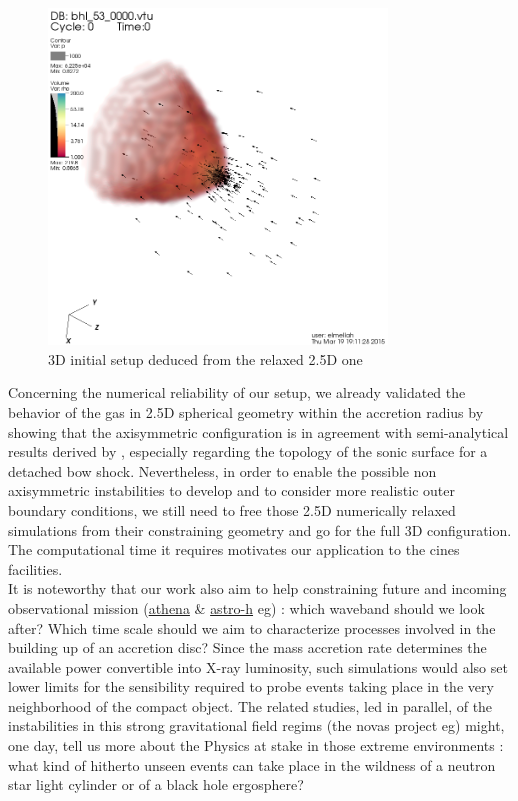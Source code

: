 \documentclass[
    a4paper, 
    12pt, onecolumn,
]{article}
\begin{document}
 \begin{figure}[h]
 \centering
 \includegraphics[width=9cm]{3D_initial_setup}  
 \caption{3D initial setup deduced from the relaxed 2.5D one}
 \label{fig:relax}
 \end{figure}
 
\indent Concerning the numerical reliability of our setup, we already validated the behavior of the gas in 2.5D spherical geometry within the accretion radius by showing that the axisymmetric configuration is in agreement with semi-analytical results derived by \citep{Foglizzo1996}, especially regarding the topology of the sonic surface for a detached bow shock. Nevertheless, in order to enable the possible non axisymmetric instabilities to develop and to consider more realistic outer boundary conditions, we still need to free those 2.5D numerically relaxed simulations from their constraining geometry and go for the full 3D configuration. The computational time it requires motivates our application to the {\sc cines} facilities.\\
\indent It is noteworthy that our work also aim to help constraining future and incoming observational mission (\href{http://www.the-athena-x-ray-observatory.eu}{{\sc athena}} \& \href{http://astro-h.isas.jaxa.jp/en/}{{\sc astro-h}} eg) : which waveband should we look after? Which time scale should we aim to characterize processes involved in the building up of an accretion disc? Since the mass accretion rate determines the available power convertible into X-ray luminosity, such simulations would also set lower limits for the sensibility required to probe events taking place in the very neighborhood of the compact object. The related studies, led in parallel, of the instabilities in this strong gravitational field regims (the {\sc nova}s project eg) might, one day, tell us more about the Physics at stake in those extreme environments : what kind of hitherto unseen events can take place in the wildness of a neutron star light cylinder or of a black hole ergosphere?
\end{document}
